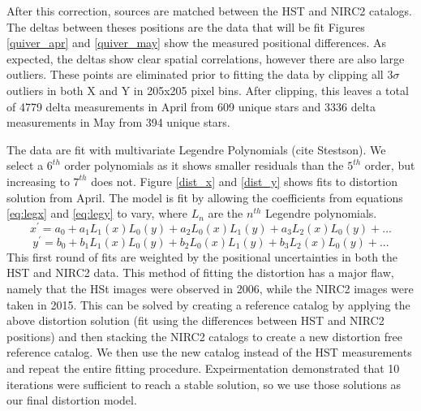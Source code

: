 After this correction, sources are matched between the HST and NIRC2 catalogs.  The deltas between theses positions are the data that will be fit   Figures \ref{quiver_apr} and \ref{quiver_may} show the measured positional differences.  As expected, the deltas show clear spatial correlations, however there are also large outliers.  These points are eliminated prior to fitting the data by clipping all 3$\sigma$ outliers in both X and Y in 205x205 pixel bins.  After clipping, this leaves a total of 4779 delta measurements in April from 609 unique stars and 3336 delta measurements in May from 394 unique stars. 

The data are fit with multivariate Legendre Polynomials (cite Stestson).  We select a $6^{th}$ order polynomials as it shows smaller residuals than the $5^{th}$ order, but increasing to $7^{th}$ does not.  Figure \ref{dist_x} and \ref{dist_y} shows fits to distortion solution from April.  The model is fit by allowing the coefficients from equations \ref{eq:legx} and \ref{eq:legy} to vary, where $L_{n}$ are the $n^{th}$ Legendre polynomials.  
\begin{equation}
x^{'} = a_{0} + a_{1}L_{1}(x)L_{0}(y) +  a_{2}L_{0}(x)L_{1}(y) + a_{3}L_{2}(x)L_{0}(y)+...
\label{eq:legx}
\end{equation}
\begin{equation}
y^{'} = b_{0} + b_{1}L_{1}(x)L_{0}(y) +  b_{2}L_{0}(x)L_{1}(y) + b_{3}L_{2}(x)L_{0}(y)+...
\label{eq:legy}
\end{equation}
This first round of fits are weighted by the positional uncertainties in both the HST and NIRC2 data.  This method of fitting the distortion has a major flaw, namely that the HSt images were observed in 2006, while the NIRC2 images were taken in 2015.   This can be solved by creating a reference catalog by applying the above distortion solution (fit using the differences between HST and NIRC2 positions) and then stacking the NIRC2 catalogs to create a new distortion free reference catalog.  We then use the new catalog instead of the HST measurements and repeat the entire fitting procedure.  Expeirmentation demonstrated that 10 iterations were sufficient to reach a stable solution, so we use those solutions as our final distortion model.  



